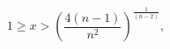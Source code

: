 \begin{equation}
1\ge x >\left ({\frac
{4(n-1)}{{n}^{2}}}\right )^\frac{1}{\left (n-2\right )},
\end{equation}

